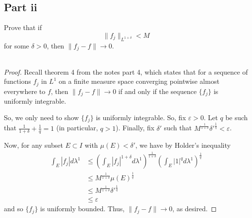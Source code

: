 \documentclass[fontsize=11pt]{scrartcl} %
\numberwithin{equation}{section} %
\numberwithin{figure}{section} %
\numberwithin{table}{section} %
\begin{document}
\subsection*{Part ii}
Prove that if
\[
    \|f_j\|_{L^{1+\delta}} < M
\]
for some $\delta>0$, then $\|f_j-f\|\to 0$.
\\
\\
\begin{proof}
    Recall theorem 4 from the notes part 4, which states that for a sequence of
    functions $f_j$ in $L^1$ on a finite measure space converging pointwise
    almost everywhere to $f$, then $\|f_j-f\|\to 0$ if and only if the sequence
    $\{f_j\}$ is uniformly integrable.

    So, we only need to show $\{f_j\}$ is uniformly integrable. So, fix
    $\varepsilon >0$. Let $q$ be such that $\frac{1}{1+\delta} +
    \frac{1}{q} = 1$ (in particular, $q>1$). Finally, fix $\delta'$ such that
    $M^{\frac{1}{1+\delta}}\delta'^{\frac{1}{q}} < \varepsilon$.

    Now, for any subset $E\subset I$ with $\mu(E)<\delta'$, we have by Holder's
    inequality
    \[
        \begin{aligned}
        \int_E |f_j|d\lambda^1 &\leq \left( \int_E|f_j|^{1+\delta}d\lambda^1
        \right)^{\frac{1}{1+\delta}}\left( \int_E |1|^qd\lambda^1
        \right)^{\frac{1}{q}}\\
        &\leq M^{\frac{1}{1+\delta}}\mu(E)^{\frac{1}{q}}\\
        &\leq M^{\frac{1}{1+\delta}}\delta'^{\frac{1}{q}}\\
        &\leq \varepsilon
        \end{aligned}
    \]
    and so $\{f_j\}$ is uniformly bounded. Thus, $\|f_j-f\|\to 0$, as desired.
\end{proof}

\newpage
\end{document}
